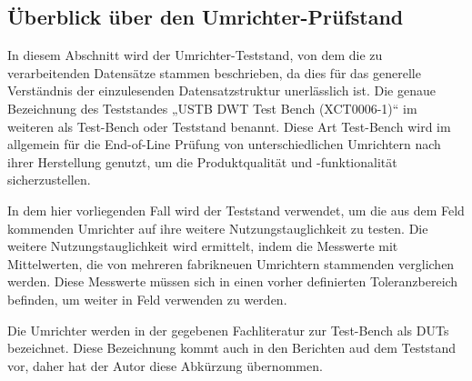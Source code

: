 
\subsection{Überblick über den Umrichter-Prüfstand}
\label{subsec:uberblick-uber-den-umrichter-prufstand}

In diesem Abschnitt wird der Umrichter-Teststand, von dem die zu verarbeitenden Datensätze stammen beschrieben,
da dies für das generelle Verständnis der einzulesenden Datensatzstruktur unerlässlich ist.
Die genaue Bezeichnung des Teststandes „USTB DWT Test Bench (XCT0006-1)“ im weiteren als Test-Bench oder Teststand benannt.
Diese Art Test-Bench wird im allgemein für die End-of-Line Prüfung von unterschiedlichen Umrichtern nach ihrer Herstellung genutzt,
um die Produktqualität und -funktionalität sicherzustellen.\cite*{Main_Manuel_USTB2018}

In dem hier vorliegenden Fall wird der Teststand verwendet, um die aus dem Feld kommenden Umrichter auf ihre weitere Nutzungstauglichkeit zu testen.
Die weitere Nutzungstauglichkeit wird ermittelt, indem die Messwerte mit Mittelwerten, die von mehreren fabrikneuen Umrichtern stammenden verglichen werden.
Diese Messwerte müssen sich in einen vorher definierten Toleranzbereich befinden, um weiter in Feld verwenden zu werden.

Die Umrichter werden in der gegebenen Fachliteratur zur Test-Bench als \ac{DUTs} bezeichnet.
Diese Bezeichnung kommt auch in den Berichten aud dem Teststand vor, daher hat der Autor diese Abkürzung übernommen.
